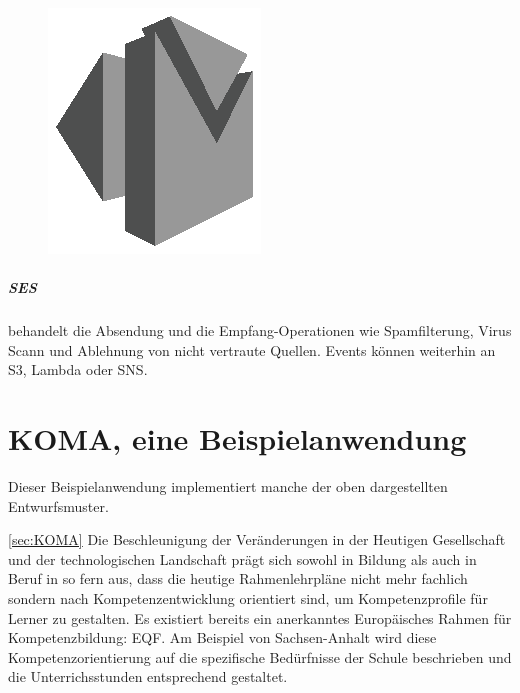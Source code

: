 \documentclass[
12pt,
english,
ngerman,
headsepline,
twoside,
openright,
numbers=noenddot,version=first
]{scrreprt}
\begin{document}
\begin{figure}
	\includegraphics[width=0.9\linewidth]{./pics/aws/Messaging_GRAYSCALE_AmazonSES.eps}
\end{figure}
\paragraph{\acrfull{SES}} behandelt die Absendung und die Empfang-Operationen wie Spamfilterung, Virus Scann und Ablehnung von nicht vertraute Quellen. Events können weiterhin an \acrshort{S3}, Lambda oder \acrshort{SNS}.

\chapter{KOMA, eine Beispielanwendung}

Dieser Beispielanwendung implementiert manche der oben dargestellten Entwurfsmuster.

\label{sec:KOMA} \autoref{sec:KOMA}
Die Beschleunigung der Veränderungen in der Heutigen Gesellschaft und der technologischen Landschaft prägt sich sowohl in Bildung als auch in Beruf in so fern aus, dass die heutige Rahmenlehrpläne nicht mehr fachlich sondern nach Kompetenzentwicklung orientiert sind, um Kompetenzprofile für Lerner zu gestalten\cite{EQF}. Es existiert bereits ein anerkanntes Europäisches Rahmen für Kompetenzbildung: \acrfull{EQF}. Am Beispiel von Sachsen-Anhalt\cite{BildungsServerSachsen} wird diese Kompetenzorientierung auf die spezifische Bedürfnisse der Schule beschrieben und die Unterrichsstunden entsprechend gestaltet.
\end{document}
